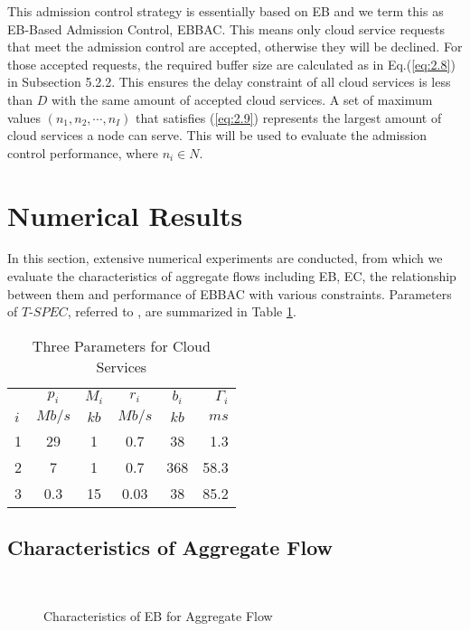 \documentclass[a4paper]{article}
\begin{document}
This admission control strategy is essentially based on EB and we term this as EB-Based Admission Control, EBBAC. This means only cloud service requests that meet the admission control are accepted, otherwise they will be declined. For those accepted requests, the required buffer size are calculated as in Eq.(\ref{eq:2.8}) in Subsection 5.2.2. This ensures the delay constraint of all cloud services is less than $D$ with the same amount of accepted cloud services. A set of maximum values $({n_1},{n_2}, \cdots ,{n_I})$ that satisfies (\ref{eq:2.9}) represents the largest amount of cloud services a node can serve. This will be used to evaluate the admission control performance, where ${n_i} \in N$.

\section{Numerical Results}

In this section, extensive numerical experiments are conducted, from which we evaluate the characteristics of aggregate flows including EB, EC, the relationship between them and performance of EBBAC with various constraints. Parameters of $T$-$SPEC$, referred to \cite{le2001}, are summarized in Table \ref{tab1}.

\begin{table}[htbp]
 \centering
 \caption{\label{tab:test}Three Parameters for Cloud Services}

 \begin{tabular}{lccccr}
  \toprule  & ${p_i}$ & ${M_i}$ & ${r_i}$ & ${b_i}$ & ${\Gamma _i}$ \\\cline{2-6}
          $i$ & $Mb/s$ & $kb$ & $Mb/s$ & $kb$ & $ms$ \\
  \midrule 1 & 29 & 1 & 0.7 & 38 & 1.3 \\
           2 & 7 & 1 & 0.7 & 368 & 58.3 \\
           3 & 0.3 & 15 & 0.03 & 38 & 85.2 \\
  \bottomrule
 \end{tabular}
 \label{tab1}
\end{table}

\subsection{Characteristics of Aggregate Flow}

\begin{figure}[h]
  \centering
  \\
  \caption{Characteristics of EB for Aggregate Flow}
  \label{fig3}
\end{figure}
\end{document}
